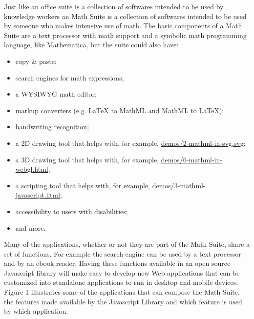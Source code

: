 Just like an office suite is a collection of softwares intended to be used by
knowledge workers an Math Suite is a collection of softwares intended to be used
by someone who makes intensive use of math. The basic components of a Math
Suite are a text processor with math support and a symbolic math programming
language, like Mathematica, but the suite could also have:
\begin{itemize}
  \item copy \& paste;
  \item search engines for math expressions;
  \item a WYSIWYG math editor;
  \item markup converters (e.g. LaTeX to MathML and MathML to LaTeX);
  \item handwriting recognition;
  \item a 2D drawing tool that helps with, for example,
    \href{http://fred-wang.github.io/MathUI2014/demos/2-mathml-in-svg.svg}{demos/2-mathml-in-svg.svg};
  \item a 3D drawing tool that helps with, for example,
    \href{http://fred-wang.github.io/MathUI2014/demos/6-mathml-in-webgl.html}{demos/6-mathml-in-webgl.html};
  \item a scripting tool that helps with, for example,
    \href{http://fred-wang.github.io/MathUI2014/demos/3-mathml-javascript.html}{demos/3-mathml-javascript.html};
  \item accessibility to users with disabilities;
  \item and more.
\end{itemize}

Many of the applications, whether or not they are part of the Math Suite,
share a set of functions. For
example the search engine can be used by a text processor and by an ebook
reader. Having
these functions available in an open source Javascript library will make easy to
develop new Web applications that can be customized into standalone applications
to run in desktop and mobile devices. Figure 1 illustrates some of the
applications that can compose the Math Suite, the features made available by the
Javascript Library and which feature is used by which application.

